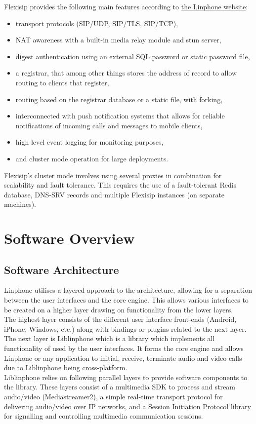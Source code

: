 \documentclass[11pt]{article}
\begin{document}
Flexisip provides the following main features according to \href{www.linphone.org}{the Linphone website}:
\begin{itemize}
\item transport protocols (SIP/UDP, SIP/TLS, SIP/TCP),
\item NAT awareness with a built-in media relay module and stun server,
\item digest authentication using an external SQL password or static password file,
\item a registrar, that among other things stores the address of record to allow routing to clients that register,
\item routing based on the registrar database or a static file, with forking,
\item interconnected with push notification systems that allows for reliable notifications of incoming calls and messages to mobile clients,
\item high level event logging for monitoring purposes,
\item and cluster mode operation for large deployments.
\end{itemize}

Flexisip's cluster mode involves using several proxies in combination for scalability and fault tolerance. This requires the use of a fault-tolerant Redis database, DNS-SRV records and multiple Flexisip instances (on separate  machines).

\section{Software Overview}
\subsection{Software Architecture}
Linphone utilises a layered approach to the architecture, allowing for a separation between the user interfaces and the core engine. This allows various interfaces to be created on a higher layer drawing on functionality from the lower layers.
\\
The highest layer consists of the different user interface front-ends (Android, iPhone, Windows, etc.) along with bindings or plugins related to the next layer.
\\
The next layer is Liblinphone which is a library which implements all functionality of used by the user interfaces. It forms the core engine and allows Linphone or any application to initial, receive, terminate audio and video calls due to Liblinphone being cross-platform.
\\
Liblinphone relies on following parallel layers to provide software components to the library. These layers consist of a multimedia SDK to process and stream audio/video (Mediastreamer2), a simple real-time transport protocol for delivering audio/video over IP networks, and a Session Initiation Protocol library for signalling and controlling multimedia communication sessions.
\end{document}

